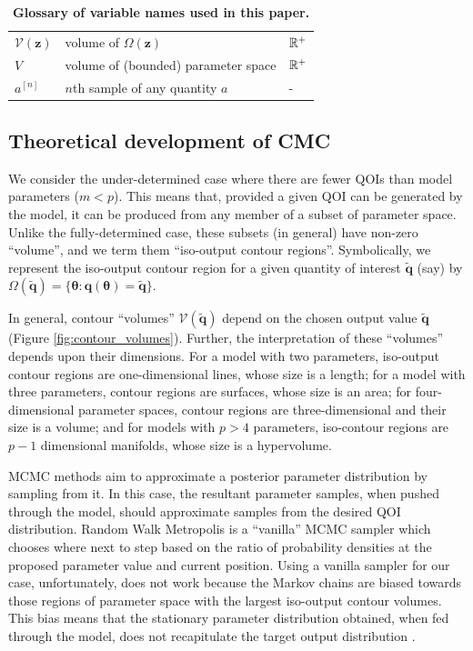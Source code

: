 \begin{table}[htbp]
\begin{adjustwidth}{-0.6in}{0in}
\begin{tabularx}{1.2\textwidth}{lll}
$\mathcal{V}(\boldsymbol{z})$         & volume of $\Omega(\boldsymbol{z})$                                 & $\mathbb{R}^+$ \\
$V$                                   & volume of (bounded) parameter space                                          & $\mathbb{R}^+$ \\
$a^{[n]}$ & $n$th sample of any quantity $a$ & -\\
\end{tabularx}
\caption{\textbf{Glossary of variable names used in this paper.}}
\label{tab:variable_glossary}
\end{adjustwidth}
\end{table}




\subsection{Theoretical development of CMC}
We consider the under-determined case where there are fewer QOIs than model parameters ($m<p$). This means that, provided a given QOI can be generated by the model, it can be produced from any member of a subset of parameter space. Unlike the fully-determined case, these subsets (in general) have non-zero ``volume'', and we term them ``iso-output contour regions''. Symbolically, we represent the iso-output contour region for a given quantity of interest $\tilde{\boldsymbol{q}}$ (say) by $\Omega(\tilde{\boldsymbol{q}}) = \{\boldsymbol{\theta}: \boldsymbol{q}(\boldsymbol{\theta}) = \tilde{\boldsymbol{q}}\}$.

In general,  contour ``volumes'' $\mathcal{V}(\tilde{\boldsymbol{q}})$  depend on the chosen output value $\tilde{\boldsymbol{q}}$ (Figure \ref{fig:contour_volumes}). Further, the interpretation of these ``volumes'' depends upon their dimensions. For a model with two parameters, iso-output contour regions are one-dimensional lines, whose size is a length; for a model with three parameters, contour regions are surfaces, whose size is an area; for four-dimensional parameter spaces, contour regions are three-dimensional and their size is a volume; and for models with $p>4$ parameters, iso-contour regions are $p-1$ dimensional manifolds, whose size is a hypervolume.

MCMC methods aim to approximate a posterior parameter distribution by sampling from it. In this case, the resultant parameter samples, when pushed through the model, should approximate samples from the desired QOI distribution. Random Walk Metropolis \cite{lambert2018Student} is a ``vanilla'' MCMC sampler which chooses where next to step based on the ratio of probability densities at the proposed parameter value and current position. Using a vanilla sampler for our case, unfortunately, does not work because the Markov chains are biased towards those regions of parameter space with the largest iso-output contour volumes. This bias means that the stationary parameter distribution obtained, when fed through the model, does not recapitulate the target output distribution \cite{lambert2018inverse}.

